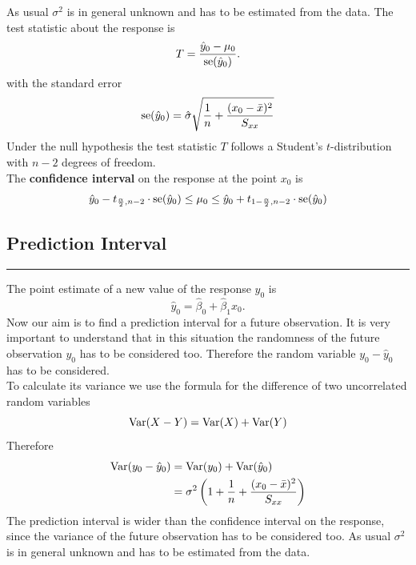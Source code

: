 As usual $\sigma^2$ is in general unknown and has to be estimated from the data. The test statistic about the response is
\begin{equation}
  T = \frac{\hat{y}_0 - \mu_0}{\textup{se}(\hat{y}_0)}.
\end{equation}
with the standard error
\begin{equation}
  \textup{se}(\hat{y}_0)=\hat{\sigma}\sqrt{\frac{1}{n} + \frac{(x_0 - \bar{x})^2}{S_{xx}}}
\end{equation}
Under the null hypothesis the test statistic $T$ follows a Student’s $t$-distribution with $n - 2$ degrees of freedom.\\
The \textbf{confidence interval} on the response at the point $x_0$ is
\begin{equation}
  \hat{y}_0 - t_{\frac{\alpha}{2},n-2} \cdot \textup{se}(\hat{y}_0)
  \leq \mu_0 \leq
  \hat{y}_0 + t_{1 - \frac{\alpha}{2},n-2} \cdot \textup{se}(\hat{y}_0)
\end{equation}

\subsection{Prediction Interval}
\noindent\rule[\linienAbstand]{\linewidth}{\linienDicke}
The point estimate of a new value of the response $y_0$ is
\begin{equation}
  \hat{y}_0 = \hat{\beta}_0 +  \hat{\beta}_1 x_0.
\end{equation}
Now our aim is to find a prediction interval for a future observation. It is very important to understand that in this situation the randomness of the future observation $y_0$ has to be considered too. Therefore the random variable $y_0 - \hat{y}_0$ has to be considered.\\
To calculate its variance we use the formula for the difference of two uncorrelated random variables
\begin{equation}
  \textup{Var}(X - Y) = \textup{Var}(X) + \textup{Var}(Y)
\end{equation}
Therefore
\begin{equation}
  \begin{split}
      \textup{Var}(y_0 - \hat{y}_0) &= \textup{Var}(y_0) + \textup{Var}(\hat{y}_0)\\
      &= \sigma^2\left(1 + \frac{1}{n} + \frac{(x_0 - \bar{x})^2}{S_{xx}}\right)
  \end{split}
\end{equation}
The prediction interval is wider than the confidence interval on the response, since the variance of the future observation has to be considered too. As usual $\sigma^2$ is in general unknown and has to be estimated from the data.

